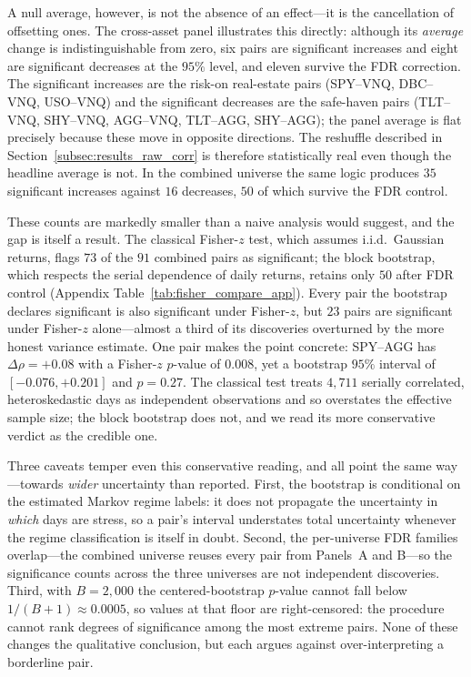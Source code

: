A null average, however, is not the absence of an effect---it is the cancellation of offsetting ones. The cross-asset panel illustrates this directly: although its \emph{average} change is indistinguishable from zero, six pairs are significant increases and eight are significant decreases at the $95\%$ level, and eleven survive the FDR correction. The significant increases are the risk-on real-estate pairs (SPY--VNQ, DBC--VNQ, USO--VNQ) and the significant decreases are the safe-haven pairs (TLT--VNQ, SHY--VNQ, AGG--VNQ, TLT--AGG, SHY--AGG); the panel average is flat precisely because these move in opposite directions. The reshuffle described in Section~\ref{subsec:results_raw_corr} is therefore statistically real even though the headline average is not. In the combined universe the same logic produces $35$ significant increases against $16$ decreases, $50$ of which survive the FDR control.

These counts are markedly smaller than a naive analysis would suggest, and the gap is itself a result. The classical Fisher-$z$ test, which assumes i.i.d.\ Gaussian returns, flags $73$ of the $91$ combined pairs as significant; the block bootstrap, which respects the serial dependence of daily returns, retains only $50$ after FDR control (Appendix Table~\ref{tab:fisher_compare_app}). Every pair the bootstrap declares significant is also significant under Fisher-$z$, but $23$ pairs are significant under Fisher-$z$ alone---almost a third of its discoveries overturned by the more honest variance estimate. One pair makes the point concrete: SPY--AGG has $\Delta\rho = +0.08$ with a Fisher-$z$ $p$-value of $0.008$, yet a bootstrap $95\%$ interval of $[-0.076, +0.201]$ and $p = 0.27$. The classical test treats $4{,}711$ serially correlated, heteroskedastic days as independent observations and so overstates the effective sample size; the block bootstrap does not, and we read its more conservative verdict as the credible one.

Three caveats temper even this conservative reading, and all point the same way---towards \emph{wider} uncertainty than reported. First, the bootstrap is conditional on the estimated Markov regime labels: it does not propagate the uncertainty in \emph{which} days are stress, so a pair's interval understates total uncertainty whenever the regime classification is itself in doubt. Second, the per-universe FDR families overlap---the combined universe reuses every pair from Panels~A and B---so the significance counts across the three universes are not independent discoveries. Third, with $B=2{,}000$ the centered-bootstrap $p$-value cannot fall below $1/(B+1) \approx 0.0005$, so values at that floor are right-censored: the procedure cannot rank degrees of significance among the most extreme pairs. None of these changes the qualitative conclusion, but each argues against over-interpreting a borderline pair.

